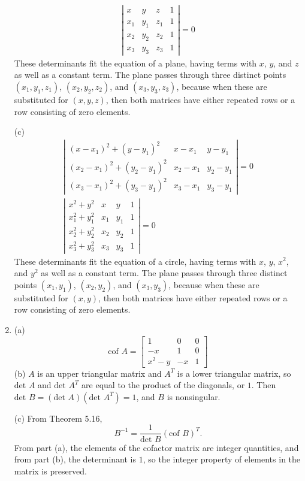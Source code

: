 \documentclass[a4paper, 12pt]{article}
\begin{document}
\begin{enumerate}
\begin{gather*}
		\left| \begin{array}{cccc}
		x & y & z & 1 \\
		x_1 & y_1 & z_1 & 1 \\
		x_2 & y_2 & z_2 & 1 \\
		x_3 & y_3 & z_3 & 1
		\end{array} \right| = 0
		\end{gather*}
		These determinants fit the equation of a plane, having terms with $x$, $y$, and $z$ as well as a constant term. The plane passes through three distinct points $(x_1, y_1, z_1)$, $(x_2, y_2, z_2)$, and $(x_3, y_3, z_3)$, because when these are substituted for $(x, y, z)$, then both matrices have either repeated rows or a row consisting of zero elements. \par
		(c)
		\begin{gather*} 
		\left| \begin{array}{ccc}
		(x - x_1)^2 + (y - y_1)^2 & x - x_1 & y - y_1 \\
		(x_2 - x_1)^2 + (y_2 - y_1)^2 & x_2 - x_1 & y_2 - y_1 \\
		(x_3 - x_1)^2 + (y_3 - y_1)^2 & x_3 - x_1 & y_3 - y_1
		\end{array} \right| = 0 \\
		\left| \begin{array}{cccc}
		x^2 + y^2 & x & y & 1 \\
		x_1^2 + y_1^2 & x_1 & y_1 & 1 \\
		x_2^2 + y_2^2 & x_2 & y_2 & 1 \\
		x_3^2 + y_3^2 & x_3 & y_3 & 1
		\end{array} \right| = 0
		\end{gather*}
		These determinants fit the equation of a circle, having terms with $x$, $y$, $x^2$, and $y^2$ as well as a constant term. The plane passes through three distinct points $(x_1, y_1)$, $(x_2, y_2)$, and $(x_3, y_3)$, because when these are substituted for $(x, y)$, then both matrices have either repeated rows or a row consisting of zero elements. \par
		
		\item (a)
		\[ \mbox{cof }A = \left[ \begin{array}{ccc}
		1 & 0 & 0 \\
		-x & 1 & 0 \\
		x^2 - y & -x & 1
		\end{array} \right] \]
		(b) $A$ is an upper triangular matrix and $A^T$ is a lower triangular matrix, so $\mbox{det }A$ and $\mbox{det }A^T$ are equal to the product of the diagonals, or $1$. Then $\mbox{det }B = (\mbox{det }A)(\mbox{det }A^T) = 1$, and $B$ is nonsingular. \par
		(c) From Theorem 5.16,
		\[ B^{-1} = \frac{1}{\mbox{det }B}\left( \mbox{cof }B \right)^T. \]
		From part (a), the elements of the cofactor matrix are integer quantities, and from part (b), the determinant is $1$, so the integer property of elements in the matrix is preserved.
		

\end{enumerate}
\end{document}
